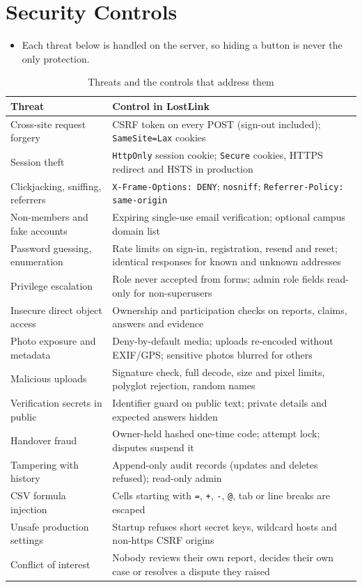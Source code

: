 \documentclass[12pt,a4paper,oneside]{report}
\newcommand{\code}[1]{\texttt{#1}}
\begin{document}
\section{Security Controls}
\begin{itemize}
  \item Each threat below is handled on the server, so hiding a button is never the only protection.
\end{itemize}
\begin{table}[H]
\centering\small
\caption{Threats and the controls that address them}
\begin{tabularx}{\textwidth}{P{38mm}X}
\toprule
Threat & Control in LostLink\\
\midrule
Cross-site request forgery & CSRF token on every POST (sign-out included); \code{SameSite=Lax} cookies\\
Session theft & \code{HttpOnly} session cookie; \code{Secure} cookies, HTTPS redirect and HSTS in production\\
Clickjacking, sniffing, referrers & \code{X-Frame-Options: DENY}; \code{nosniff}; \code{Referrer-Policy: same-origin}\\
Non-members and fake accounts & Expiring single-use email verification; optional campus domain list\\
Password guessing, enumeration & Rate limits on sign-in, registration, resend and reset; identical responses for known and unknown addresses\\
Privilege escalation & Role never accepted from forms; admin role fields read-only for non-superusers\\
Insecure direct object access & Ownership and participation checks on reports, claims, answers and evidence\\
Photo exposure and metadata & Deny-by-default media; uploads re-encoded without EXIF/GPS; sensitive photos blurred for others\\
Malicious uploads & Signature check, full decode, size and pixel limits, polyglot rejection, random names\\
Verification secrets in public & Identifier guard on public text; private details and expected answers hidden\\
Handover fraud & Owner-held hashed one-time code; attempt lock; disputes suspend it\\
Tampering with history & Append-only audit records (updates and deletes refused); read-only admin\\
CSV formula injection & Cells starting with \code{=}, \code{+}, \code{-}, \code{@}, tab or line breaks are escaped\\
Unsafe production settings & Startup refuses short secret keys, wildcard hosts and non-https CSRF origins\\
Conflict of interest & Nobody reviews their own report, decides their own case or resolves a dispute they raised\\
\bottomrule
\end{tabularx}
\end{table}
\end{document}
